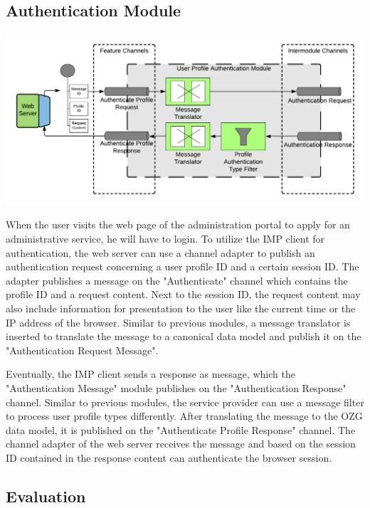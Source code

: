 \subsection{Authentication Module}

\begin{center}
    \includegraphics[scale=0.6]{Diagrams/Integration Architecture 1/Technological Integration/17. Authentication.pdf}
\end{center}

When the user visits the web page of the administration portal to apply for an administrative service, he will have to login. To utilize the IMP client for authentication, the web server can use a channel adapter to publish an authentication request concerning a user profile ID and a certain session ID. The adapter publishes a message on the "Authenticate" channel which contains the profile ID and a request content. Next to the session ID, the request content may also include information for presentation to the user like the current time or the IP address of the browser. Similar to previous modules, a message translator is inserted to translate the message to a canonical data model and publish it on the "Authentication Request Message".

Eventually, the IMP client sends a response as message, which the "Authentication Message" module publishes on the "Authentication Response" channel. Similar to previous modules, the service provider can use a message filter to process user profile types differently. After translating the message to the OZG data model, it is published on the "Authenticate Profile Response" channel. The channel adapter of the web server receives the message and based on the session ID contained in the response content can authenticate the browser session.

\subsection{Evaluation}


